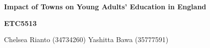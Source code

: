\begin{titlepage}
  \centering
  \vspace*{\fill}

  {\fontsize{34}{36}\selectfont\bfseries\color{pastelblue} Impact of Towns on Young Adults' Education in England \par}
  \vspace{1.2cm}

  {\fontsize{18}{20}\selectfont\bfseries ETC5513 \par}
  \vspace{2cm}

  {\fontsize{16}{18}\selectfont Chelsea Rianto (34734260) \quad Yashitta Bawa (35777591) \par}
  \vspace{1.5cm}

  \vspace*{\fill}
\end{titlepage}
\clearpage
